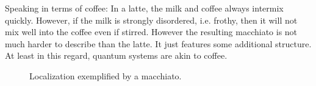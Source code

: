 %


Speaking in terms of coffee: In a latte, the milk and coffee always intermix quickly. However, if the milk is strongly
disordered, i.e. frothy, then it will not mix well into the coffee even if stirred. However the resulting macchiato is not much harder to describe than the latte. It just features some additional structure.
At least in this regard, quantum systems are akin to coffee.

\begin{figure}[hbt]
	\centering
	\hfil
	\hfil
	\raisebox{-0.5\height}{\scalebox{4}{$\longrightarrow$}}
	\hfil
	\hfil
	\caption{Localization exemplified by a macchiato.}
	\label{fig:localized-macciato}
\end{figure}
